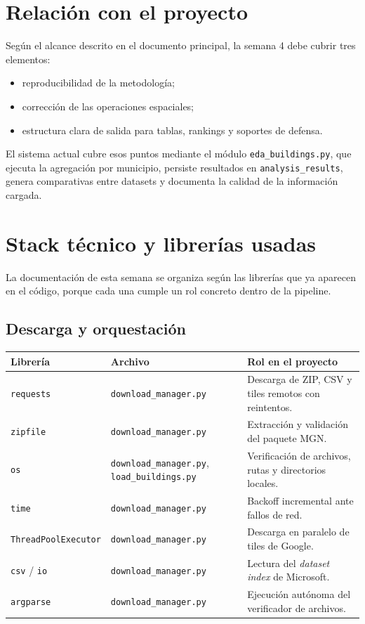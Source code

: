 \documentclass[12pt,a4paper]{article}
\begin{document}
\section{Relaci\'on con el proyecto}

Seg\'un el alcance descrito en el documento principal, la semana 4 debe cubrir tres elementos:

\begin{itemize}
  \item reproducibilidad de la metodolog\'ia;
  \item correcci\'on de las operaciones espaciales;
  \item estructura clara de salida para tablas, rankings y soportes de defensa.
\end{itemize}

El sistema actual cubre esos puntos mediante el m\'odulo \texttt{eda\_buildings.py}, que ejecuta la agregaci\'on por municipio, persiste resultados en \texttt{analysis\_results}, genera comparativas entre datasets y documenta la calidad de la informaci\'on cargada.

\section{Stack t\'ecnico y librer\'ias usadas}

La documentaci\'on de esta semana se organiza seg\'un las librer\'ias que ya aparecen en el c\'odigo, porque cada una cumple un rol concreto dentro de la pipeline.

\subsection{Descarga y orquestaci\'on}

\begin{longtable}{|p{4cm}|p{4cm}|p{5cm}|}
\hline
\textbf{Librer\'ia} & \textbf{Archivo} & \textbf{Rol en el proyecto} \\\hline
\texttt{requests} & \texttt{download\_manager.py} & Descarga de ZIP, CSV y tiles remotos con reintentos. \\\hline
\texttt{zipfile} & \texttt{download\_manager.py} & Extracci\'on y validaci\'on del paquete MGN. \\\hline
\texttt{os} & \texttt{download\_manager.py}, \texttt{load\_buildings.py} & Verificaci\'on de archivos, rutas y directorios locales. \\\hline
\texttt{time} & \texttt{download\_manager.py} & Backoff incremental ante fallos de red. \\\hline
\texttt{ThreadPoolExecutor} & \texttt{download\_manager.py} & Descarga en paralelo de tiles de Google. \\\hline
\texttt{csv} / \texttt{io} & \texttt{download\_manager.py} & Lectura del \textit{dataset index} de Microsoft. \\\hline
\texttt{argparse} & \texttt{download\_manager.py} & Ejecuci\'on aut\'onoma del verificador de archivos. \\\hline
\end{longtable}
\end{document}
